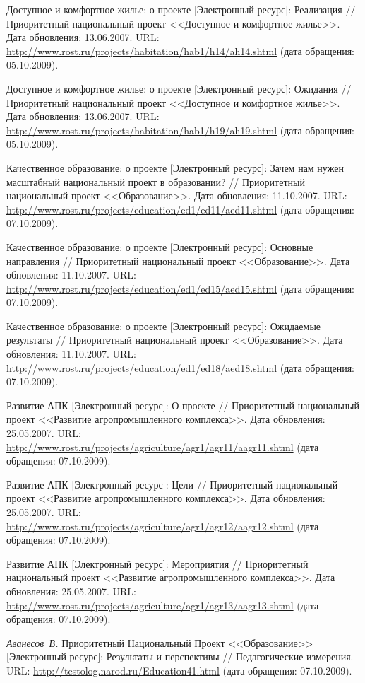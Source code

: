 \begin{thebibliography}{99}
 Доступное и комфортное жилье: о проекте
  [Электронный ресурс]: Реализация // Приоритетный национальный проект
  <<Доступное и комфортное жилье>>. Дата обновления: 13.06.2007. URL:
  \url{http://www.rost.ru/projects/habitation/hab1/h14/ah14.shtml}
  (дата обращения: 05.10.2009).

 Доступное и комфортное жилье: о проекте
  [Электронный ресурс]: Ожидания // Приоритетный национальный проект
  <<Доступное и комфортное жилье>>. Дата обновления: 13.06.2007. URL:
  \url{http://www.rost.ru/projects/habitation/hab1/h19/ah19.shtml}
  (дата обращения: 05.10.2009).

 Качественное образование: о проекте
  [Электронный ресурс]: Зачем нам нужен масштабный национальный проект
  в образовании? // Приоритетный национальный проект
  <<Образование>>. Дата обновления: 11.10.2007. URL:
  \url{http://www.rost.ru/projects/education/ed1/ed11/aed11.shtml}
  (дата обращения: 07.10.2009).

 Качественное образование: о проекте [Электронный
  ресурс]: Основные направления // Приоритетный национальный проект
  <<Образование>>. Дата обновления: 11.10.2007. URL:
  \url{http://www.rost.ru/projects/education/ed1/ed15/aed15.shtml}
  (дата обращения: 07.10.2009).

 Качественное образование: о проекте
  [Электронный ресурс]: Ожидаемые результаты // Приоритетный
  национальный проект <<Образование>>. Дата обновления:
  11.10.2007. URL:
  \url{http://www.rost.ru/projects/education/ed1/ed18/aed18.shtml}
  (дата обращения: 07.10.2009).

 Развитие АПК [Электронный ресурс]: О проекте //
  Приоритетный национальный проект <<Развитие агропромышленного
  комплекса>>. Дата обновления: 25.05.2007. URL:
  \url{http://www.rost.ru/projects/agriculture/agr1/agr11/aagr11.shtml}
  (дата обращения: 07.10.2009).

 Развитие АПК [Электронный ресурс]: Цели //
  Приоритетный национальный проект <<Развитие агропромышленного
  комплекса>>. Дата обновления: 25.05.2007. URL:
  \url{http://www.rost.ru/projects/agriculture/agr1/agr12/aagr12.shtml}
  (дата обращения: 07.10.2009).

 Развитие АПК [Электронный ресурс]: Мероприятия //
  Приоритетный национальный проект <<Развитие агропромышленного
  комплекса>>. Дата обновления: 25.05.2007. URL:
  \url{http://www.rost.ru/projects/agriculture/agr1/agr13/aagr13.shtml}
  (дата обращения: 07.10.2009).

 \emph{Аванесов~В.}  Приоритетный Национальный
  Проект <<Образование>> [Электронный ресурс]: Результаты и
  перспективы // Педагогические измерения. URL:
  \url{http://testolog.narod.ru/Education41.html}
  (дата обращения: 07.10.2009).
  
\end{thebibliography}

